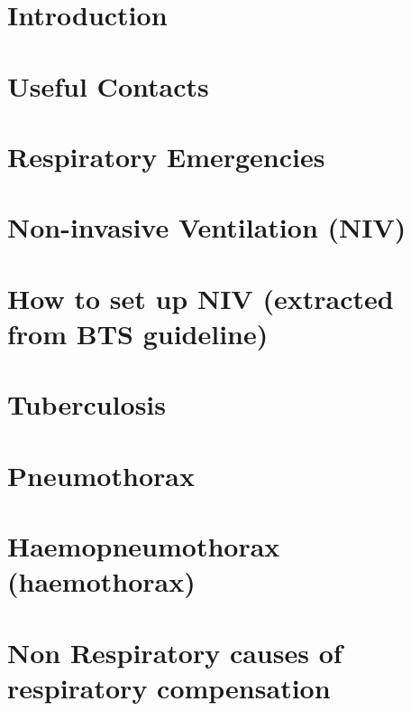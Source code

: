 \documentclass[]{book}
\begin{document}
\hypertarget{introduction}{%
\section{Introduction}\label{introduction}}

\hypertarget{useful-contacts}{%
\section{Useful Contacts}\label{useful-contacts}}

\hypertarget{respiratory-emergencies}{%
\section{Respiratory Emergencies}\label{respiratory-emergencies}}

\hypertarget{non-invasive-ventilation-niv}{%
\section{Non-invasive Ventilation (NIV)}\label{non-invasive-ventilation-niv}}

\hypertarget{how-to-set-up-niv-extracted-from-bts-guideline}{%
\section{How to set up NIV (extracted from BTS guideline)}\label{how-to-set-up-niv-extracted-from-bts-guideline}}

\hypertarget{tuberculosis}{%
\section{Tuberculosis}\label{tuberculosis}}

\hypertarget{pneumothorax}{%
\section{Pneumothorax}\label{pneumothorax}}

\hypertarget{haemopneumothorax-haemothorax}{%
\section{Haemopneumothorax (haemothorax)}\label{haemopneumothorax-haemothorax}}

\hypertarget{non-respiratory-causes-of-respiratory-compensation}{%
\section{Non Respiratory causes of respiratory compensation}\label{non-respiratory-causes-of-respiratory-compensation}}
\end{document}
